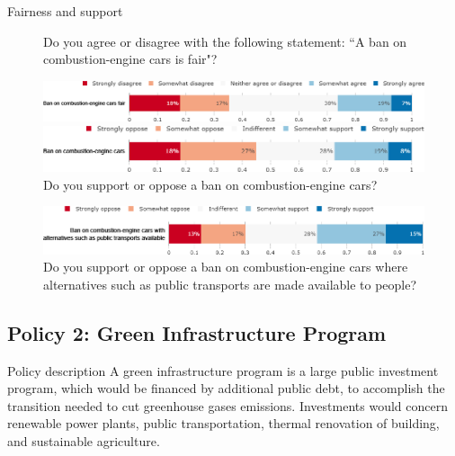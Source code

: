 \begin{framefont}{\small}
\begin{frame}{Fairness and support}%
\begin{figure}[h!]
\centering
\caption{Do you agree or disagree with the following statement: ``A ban on combustion-engine cars is fair"?}
\includegraphics[width=.87\paperwidth]{../figures/FR/standard_fair_FR.png}
\vspace{.5cm}
\centering
\caption{Do you support or oppose a ban on combustion-engine cars?}
\includegraphics[width=.87\paperwidth]{../figures/FR/standard_support_FR.png}
\end{figure}

\end{frame}

\begin{frame}{}%
\begin{figure}[h!]
\centering
\caption{Do you support or oppose a ban on combustion-engine cars where alternatives such as public transports are made available to people?}
\includegraphics[width=.87\paperwidth]{../figures/FR/standard_public_transport_support_FR.png}
\end{figure}
\end{frame}

\subsection{Policy 2: Green Infrastructure Program}

\begin{frame}{Policy description}%
A green infrastructure program is a large public investment program, which would be financed by additional public debt, to accomplish the transition needed to cut greenhouse gases emissions. Investments would concern renewable power plants, public transportation, thermal renovation of building, and sustainable agriculture.
\end{frame}


\end{framefont}
